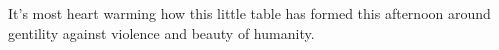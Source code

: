 

It's most heart warming how this little table has formed this
afternoon around gentility against violence and beauty of humanity.

\bye
